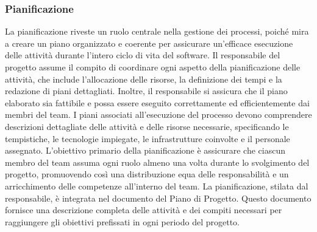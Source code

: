 \subsubsection{Pianificazione}
La pianificazione riveste un ruolo centrale nella gestione dei processi, poiché mira a creare un piano organizzato e coerente per assicurare un’efficace esecuzione delle attività durante l’intero ciclo di vita del software.
Il responsabile del progetto assume il compito di coordinare ogni aspetto della pianificazione delle attività, che include l’allocazione delle risorse, la definizione dei tempi e la redazione di piani dettagliati. Inoltre, il responsabile si assicura che il piano elaborato sia fattibile e possa essere eseguito correttamente ed efficientemente dai membri del team.
I piani associati all’esecuzione del processo devono comprendere descrizioni dettagliate delle attività e delle risorse necessarie, specificando le tempistiche, le tecnologie impiegate, le infrastrutture coinvolte e il personale assegnato.
L’obiettivo primario della pianificazione è assicurare che ciascun membro del team assuma ogni ruolo almeno una volta durante lo svolgimento del progetto, promuovendo così una distribuzione equa delle responsabilità e un arricchimento delle competenze all’interno del team.
La pianificazione, stilata dal responsabile, è integrata nel documento del Piano di Progetto. Questo documento fornisce una descrizione completa delle attività e dei compiti necessari per raggiungere gli obiettivi prefissati in ogni periodo del progetto.

